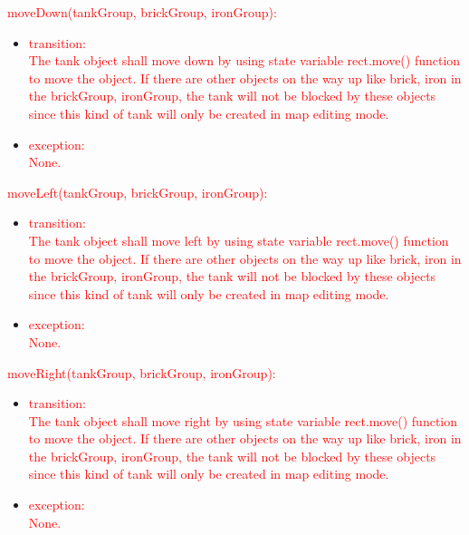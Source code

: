 \documentclass[12pt, titlepage]{article}
\begin{document}
	    \textcolor{red}{moveDown(tankGroup, brickGroup, ironGroup):}
	    \begin{itemize}
	    \item \textcolor{red}{transition:}\\
	    \textcolor{red}{The tank object shall move down by using state variable rect.move() function to move the object. If there are other objects on the way up like brick, iron in the brickGroup, ironGroup, the tank will not be blocked by these objects since this kind of tank will only be created in map editing mode.\\}
	    
	    \item \textcolor{red}{exception:\\ None.}
	    \end{itemize}
	    
	    \textcolor{red}{moveLeft(tankGroup, brickGroup, ironGroup):}
	    \begin{itemize}
	    \item \textcolor{red}{transition:\\}
	    \textcolor{red}{The tank object shall move left by using state variable rect.move() function to move the object. If there are other objects on the way up like brick, iron in the brickGroup, ironGroup, the tank will not be blocked by these objects since this kind of tank will only be created in map editing mode.\\}
	    
	    \item \textcolor{red}{exception:\\ None.}
	    \end{itemize}
	    
	    \textcolor{red}{moveRight(tankGroup, brickGroup, ironGroup):}
	    \begin{itemize}
	    \item \textcolor{red}{transition:\\}
	    \textcolor{red}{The tank object shall move right by using state variable rect.move() function to move the object. If there are other objects on the way up like brick, iron in the brickGroup, ironGroup, the tank will not be blocked by these objects since this kind of tank will only be created in map editing mode.\\}
	    
	    \item \textcolor{red}{exception:\\ None.}
	    \end{itemize}
        
\end{document}
